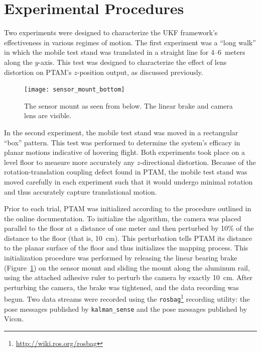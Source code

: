 \section{Experimental Procedures}

Two experiments were designed to characterize the UKF framework's effectiveness in various regimes of motion. The first experiment was a ``long walk'' in which the mobile test stand was translated in a straight line for 4--6~meters along the $y$-axis. This test was designed to characterize the effect of lens distortion on PTAM's $z$-position output, as discussed previously.

\begin{figure}
        \centering
        \texttt{[image: sensor\_mount\_bottom]}
        \caption[Sensor Mount Bottom View]{The sensor mount as seen from below. The linear brake and camera lens are visible.}
        \label{fig:sensor_mount_bottom}
\end{figure}

In the second experiment, the mobile test stand was moved in a rectangular ``box'' pattern. This test was performed to determine the system's efficacy in planar motions indicative of hovering flight. Both experiments took place on a level floor to measure more accurately any $z$-directional distortion. Because of the rotation-translation coupling defect found in PTAM, the mobile test stand was moved carefully in each experiment such that it would undergo minimal rotation and thus accurately capture translational motion.

Prior to each trial, PTAM was initialized according to the procedure outlined in the online documentation. To initialize the algorithm, the camera was placed parallel to the floor at a distance of one meter and then perturbed by 10\% of the distance to the floor (that is, 10~cm). This perturbation tells PTAM its distance to the planar surface of the floor and thus initializes the mapping process. This initialization procedure was performed by releasing the linear bearing brake (Figure~\ref{fig:sensor_mount_bottom}) on the sensor mount and sliding the mount along the aluminum rail, using the attached adhesive ruler to perturb the camera by exactly 10~cm. After perturbing the camera, the brake was tightened, and the data recording was begun. Two data streams were recorded using the \texttt{rosbag}\footnote{\url{http://wiki.ros.org/rosbag}} recording utility: the pose messages published by \texttt{kalman\_sense} and the pose messages published by Vicon.

